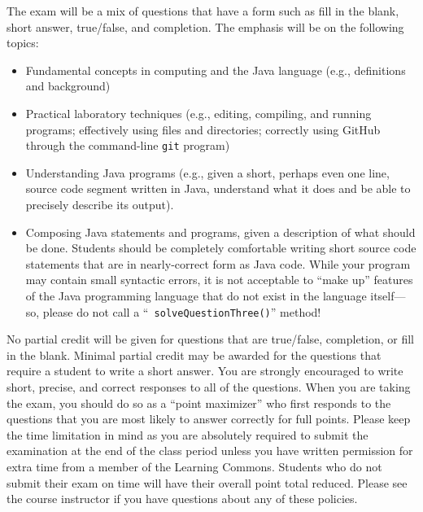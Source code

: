 \documentclass[11pt]{article}
\begin{document}
\noindent The exam will be a mix of questions that have a form such as fill in
the blank, short answer, true/false, and completion. The emphasis will be on the
following topics:

\vspace*{-.05in}
\begin{itemize}

  \itemsep 0in

  \item Fundamental concepts in computing and the Java language (e.g.,
    definitions and background)

  \item Practical laboratory techniques (e.g., editing, compiling, and running
    programs; effectively using files and directories; correctly using GitHub
    through the command-line {\tt git} program)

  \item Understanding Java programs (e.g., given a short, perhaps even one line,
    source code segment written in Java, understand what it does and be able to
    precisely describe its output).

  \item Composing Java statements and programs, given a description of what
    should be done. Students should be completely comfortable writing short
    source code statements that are in nearly-correct form as Java code. While
    your program may contain small syntactic errors, it is not acceptable to
    ``make up'' features of the Java programming language that do not exist in
    the language itself---so, please do not call a ``{\tt
    solveQuestionThree()}'' method!

\end{itemize}

\noindent No partial credit will be given for questions that are true/false,
completion, or fill in the blank. Minimal partial credit may be awarded for the
questions that require a student to write a short answer. You are strongly
encouraged to write short, precise, and correct responses to all of the
questions. When you are taking the exam, you should do so as a ``point
maximizer'' who first responds to the questions that you are most likely to
answer correctly for full points. Please keep the time limitation in mind as you
are absolutely required to submit the examination at the end of the class period
unless you have written permission for extra time from a member of the Learning
Commons. Students who do not submit their exam on time will have their overall
point total reduced. Please see the course instructor if you have questions
about any of these policies.
\end{document}

